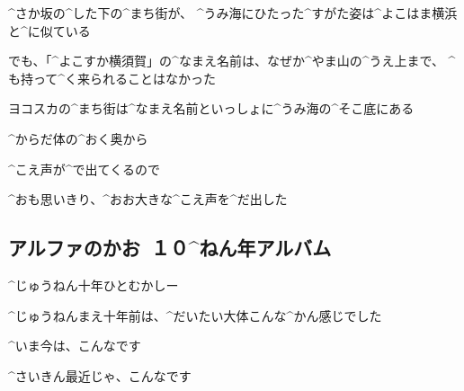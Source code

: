\A ^{さか}{坂}の^{した}{下}の^{まち}{街}が、
^{うみ}{海}にひたった^{すがた}{姿}は^{よこはま}{横浜}と^{に}{似}ている

\A でも、「^{よこすか}{横須賀}」の^{なまえ}{名前}は、なぜか^{やま}{山}の^{うえ}{上}まで、
^{も}{持}って^{く}{来}られることはなかった

\page
\A ヨコスカの^{まち}{街}は^{なまえ}{名前}といっしょに^{うみ}{海}の^{そこ}{底}にある

\page[147]
\A ^{からだ}{体}の^{おく}{奥}から

\page
\A ^{こえ}{声}が^{で}{出}てくるので

\A ^{おも}{思}いきり、^{おお}{大}きな^{こえ}{声}を^{だ}{出}した



\subsection{アルファのかお\ １０^{ねん}{年}アルバム}

\A ^{じゅうねん}{十年}ひとむかしー

\A ^{じゅうねんまえ}{十年前}は、^{だいたい}{大体}こんな^{かん}{感}じでした

\A ^{いま}{今}は、こんなです

\A ^{さいきん}{最近}じゃ、こんなです
